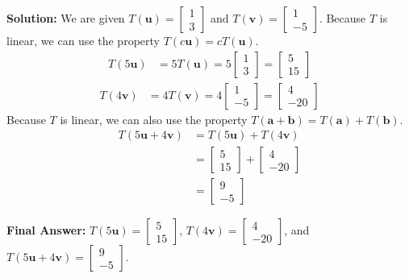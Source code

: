 \documentclass[11pt]{article}
\begin{document}
\textbf{Solution:}
We are given $T(\mathbf{u}) = \begin{bmatrix} 1 \\ 3 \end{bmatrix}$ and $T(\mathbf{v}) = \begin{bmatrix} 1 \\ -5 \end{bmatrix}$.
Because $T$ is linear, we can use the property $T(c\mathbf{u}) = cT(\mathbf{u})$.
\begin{align*}
    T(5\mathbf{u}) &= 5T(\mathbf{u}) = 5\begin{bmatrix} 1 \\ 3 \end{bmatrix} = \begin{bmatrix} 5 \\ 15 \end{bmatrix}
\end{align*}
\begin{align*}
    T(4\mathbf{v}) &= 4T(\mathbf{v}) = 4\begin{bmatrix} 1 \\ -5 \end{bmatrix} = \begin{bmatrix} 4 \\ -20 \end{bmatrix}
\end{align*}
Because $T$ is linear, we can also use the property $T(\mathbf{a} + \mathbf{b}) = T(\mathbf{a}) + T(\mathbf{b})$.
\begin{align*}
    T(5\mathbf{u} + 4\mathbf{v}) &= T(5\mathbf{u}) + T(4\mathbf{v}) \\
    &= \begin{bmatrix} 5 \\ 15 \end{bmatrix} + \begin{bmatrix} 4 \\ -20 \end{bmatrix} \\
    &= \begin{bmatrix} 9 \\ -5 \end{bmatrix}
\end{align*}

\textbf{Final Answer:} $T(5\mathbf{u}) = \begin{bmatrix} 5 \\ 15 \end{bmatrix}$, $T(4\mathbf{v}) = \begin{bmatrix} 4 \\ -20 \end{bmatrix}$, and $T(5\mathbf{u} + 4\mathbf{v}) = \begin{bmatrix} 9 \\ -5 \end{bmatrix}$.
\end{document}
